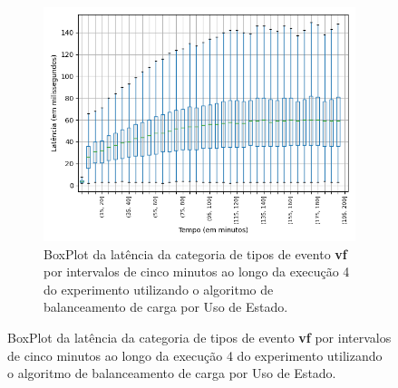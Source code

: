 

\begin{figure}
\centering
\begin{subfigure}{.5\textwidth}
\centering
\includegraphics[width=\textwidth]{figuras/graphics/boxplot_9-dez-su_vf.png}
\caption{BoxPlot da latência da categoria de tipos de evento \textbf{vf} por intervalos de cinco minutos ao longo da execução 4 do experimento utilizando o algoritmo de balanceamento de carga por Uso de Estado.}
\label{fig:BoxPlot_vf_SU_9-dez-su}
\end{subfigure}%


\end{figure}
